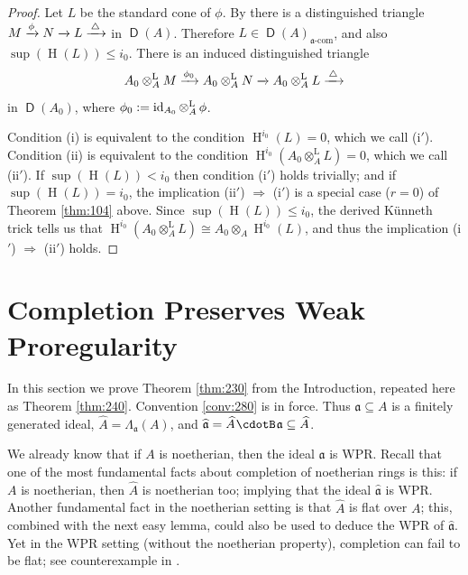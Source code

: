 \documentclass[10pt]{amsart}
\theoremstyle{definition}
\numberwithin{equation}{section}
\newcommand{\xar}{\xrightarrow}
\newcommand{\sub}{\subseteq}
\newcommand{\opn}{\operatorname}
\newcommand{\cat}[1]{\operatorname{\mathsf{#1}}}
\newcommand{\cd}{\mspace{1.3mu}{\cdotB}\mspace{1.3mu}}
\newcommand{\mfrak}[1]{\mathfrak{#1}}
\newcommand{\mrm}[1]{\mathrm{#1}}
\newcommand{\La}{\Lambda}
\renewcommand{\a}{\mfrak{a}}
\newcommand{\tup}[1]{\textrm{#1}}
\newcommand{\ot}{\otimes}
\newcommand{\what}[1]{\widehat{#1}}
\newcommand{\msp}[1]{\mspace{#1 mu}}
\begin{document}
\begin{proof}
Let $L$ be the standard cone of $\phi$. By \cite[Proposition 7.3.5]{Ye5} there
is a distinguished triangle
$M \xar{\phi} N \xar{} L \xar{\msp{3} \triangle \msp{3}}$
in $\cat{D}(A)$. Therefore $L \in \cat{D}(A)_{\tup{$\a$-com}}$,
and also $\opn{sup}(\opn{H}(L)) \leq i_0$.
There is an induced distinguished triangle
\[ A_0 \ot^{\mrm{L}}_{A} M \xar{\phi_0} A_0 \ot^{\mrm{L}}_{A} N \xar{}
A_0 \ot^{\mrm{L}}_{A} L \xar{\msp{3} \triangle \msp{3}} \]
in $\cat{D}(A_0)$, where
$\phi_0 := \opn{id}_{A_0} \ot^{\mrm{L}}_{A}  \msp{3} \phi$.

Condition (i) is equivalent to the condition $\opn{H}^{i_0}(L) = 0$, which
we call (i$'$).
Condition (ii) is equivalent to the condition
$\opn{H}^{i_0}(A_0 \ot^{\mrm{L}}_{A} L) = 0$, which
we call (ii$'$).
If $\opn{sup}(\opn{H}(L)) < i_0$ then condition (i$'$) holds trivially;
and if $\opn{sup}(\opn{H}(L)) = i_0$, the implication
(ii$'$) $\Rightarrow$ (i$'$) is a special case ($r = 0$) of
Theorem \ref{thm:104} above.
Since $\opn{sup}(\opn{H}(L)) \leq i_0$,
the derived K\"unneth trick \cite[Theorem 7]{Ye7} tells us that
$\opn{H}^{i_0}(A_0 \ot^{\mrm{L}}_{A} L) \cong
A_0 \ot_{A} \opn{H}^{i_0}(L)$,
and thus the implication (i$'$) $\Rightarrow$ (ii$'$) holds.
\end{proof}







\section{Completion Preserves Weak Proregularity}
\label{sec:WPR-and-comp}

In this section we prove Theorem \ref{thm:230} from the
Introduction, repeated here as Theorem \ref{thm:240}.
Convention \ref{conv:280} is in force.
Thus $\a \sub A$ is a finitely generated ideal, $\what{A} = \La_{\a}(A)$,
and $\what{\a} = \what{A} \cd \a \sub \what{A}$.

We already know that if $A$ is noetherian, then the ideal $\a$ is WPR.
Recall that one of the most fundamental facts about completion of noetherian
rings is this:
if $A$ is noetherian, then $\what{A}$ is noetherian too; implying that the
ideal $\what{\a}$ is WPR.
Another fundamental fact in the noetherian setting is that $\what{A}$ is flat
over $A$; this, combined with the next easy lemma, could also be used to
deduce the WPR of $\what{\a}$. Yet in the WPR setting (without the noetherian
property), completion can fail to be flat; see counterexample in
\cite[Theorem 7.2]{Ye4}.
\end{document}
